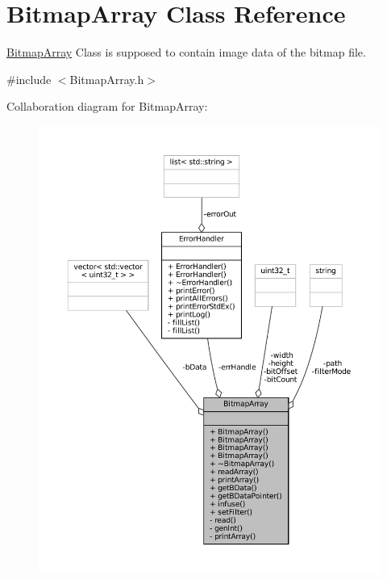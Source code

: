 \hypertarget{classBitmapArray}{}\section{Bitmap\+Array Class Reference}
\label{classBitmapArray}


\mbox{\hyperlink{classBitmapArray}{Bitmap\+Array}} Class is supposed to contain image data of the bitmap file.  




{\ttfamily \#include $<$Bitmap\+Array.\+h$>$}



Collaboration diagram for Bitmap\+Array\+:\nopagebreak
\begin{figure}[H]
\begin{center}
\leavevmode
\includegraphics[width=350pt]{classBitmapArray__coll__graph}
\end{center}
\end{figure}

